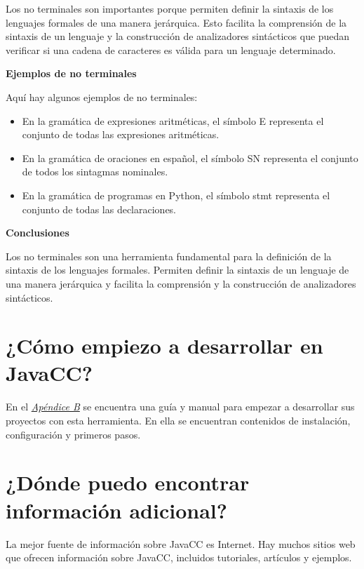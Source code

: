 Los no terminales son importantes porque permiten definir la sintaxis de los lenguajes formales de una manera jerárquica. Esto facilita la comprensión de la sintaxis de un lenguaje y la construcción de analizadores sintácticos que puedan verificar si una cadena de caracteres es válida para un lenguaje determinado.

\phantom{text}

\noindent \textbf{Ejemplos de no terminales}

\phantom{text}

\noindent Aquí hay algunos ejemplos de no terminales:

\begin{itemize}
    \item En la gramática de expresiones aritméticas, el símbolo E representa el conjunto de todas las expresiones aritméticas.
    \item En la gramática de oraciones en español, el símbolo SN representa el conjunto de todos los sintagmas nominales.
    \item En la gramática de programas en Python, el símbolo stmt representa el conjunto de todas las declaraciones.
\end{itemize}

\phantom{text}

\noindent \textbf{Conclusiones}

\phantom{text}

\noindent Los no terminales son una herramienta fundamental para la definición de la sintaxis de los lenguajes formales. Permiten definir la sintaxis de un lenguaje de una manera jerárquica y facilita la comprensión y la construcción de analizadores sintácticos.

\section{¿Cómo empiezo a desarrollar en JavaCC?}

\noindent En el \hyperref[sec:instalaciondejavacc]{\textit{Apéndice B}} se encuentra una guía y manual para empezar a desarrollar sus proyectos con esta herramienta. En ella se encuentran contenidos de instalación, configuración y primeros pasos.


\section{¿Dónde puedo encontrar información adicional?}

\noindent La mejor fuente de información sobre JavaCC es Internet. Hay muchos sitios web que ofrecen información sobre JavaCC, incluidos tutoriales, artículos y ejemplos.

